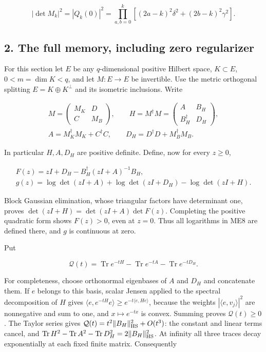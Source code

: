 \documentclass[11pt]{article}
\begin{document}
\[
|\det M_k|^2=|Q_k(0)|^2
=\prod_{a,b=0}^k[(2a-k)^2\delta^2+(2b-k)^2\gamma^2].
\tag{ME6}
\]

\subsection{2. The full memory, including zero regularizer}\label{the-full-memory-including-zero-regularizer}

For this section let \(E\) be any \(q\)-dimensional positive Hilbert space, \(K\subset E\), \(0<m=\dim K<q\), and let \(M:E\to E\) be invertible. Use the metric orthogonal splitting \(E=K\oplus K^\perp\) and its isometric inclusions. Write

\[
\begin{gathered}
M=\begin{pmatrix}M_K&D\\C&M_B\end{pmatrix},\qquad
H=M^\dagger M=\begin{pmatrix}A&B_H\\B_H^\dagger&D_H\end{pmatrix},\\
A=M_K^\dagger M_K+C^\dagger C,\qquad D_H=D^\dagger D+M_B^\dagger M_B.
\end{gathered}
\tag{ME7}
\]

In particular \(H,A,D_H\) are positive definite. Define, now for every \(z\ge0\),

\[
\begin{gathered}
F(z)=zI+D_H-B_H^\dagger(zI+A)^{-1}B_H,\\
g(z)=\log\det(zI+A)+\log\det(zI+D_H)-\log\det(zI+H).
\end{gathered}
\tag{ME8}
\]

Block Gaussian elimination, whose triangular factors have determinant one, proves \(\det(zI+H)=\det(zI+A)\det F(z)\). Completing the positive quadratic form shows \(F(z)>0\), even at \(z=0\). Thus all logarithms in ME8 are defined there, and \(g\) is continuous at zero.

Put

\[
\mathcal Q(t)=\operatorname{Tr}e^{-tH}
-\operatorname{Tr}e^{-tA}-\operatorname{Tr}e^{-tD_H}.
\tag{ME9}
\]

For completeness, choose orthonormal eigenbases of \(A\) and \(D_H\) and concatenate them. If \(e\) belongs to this basis, scalar Jensen applied to the spectral decomposition of \(H\) gives \(\langle e,e^{-tH}e\rangle\ge e^{-t\langle e,He\rangle}\), because the weights \(|\langle e,v_j\rangle|^2\) are nonnegative and sum to one, and \(x\mapsto e^{-tx}\) is convex. Summing proves \(\mathcal Q(t)\ge0\). The Taylor series gives \(\mathcal Q(t)=t^2\|B_H\|_{\rm HS}^2+O(t^3)\): the constant and linear terms cancel, and \(\operatorname{Tr}H^2-\operatorname{Tr}A^2-\operatorname{Tr}D_H^2=2\|B_H\|_{\rm HS}^2\). At infinity all three traces decay exponentially at each fixed finite matrix. Consequently
\end{document}
